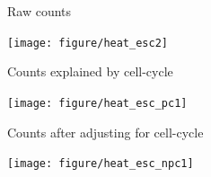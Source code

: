 \documentclass{beamer}\usepackage[]{graphicx}\usepackage[]{color}
\newenvironment{knitrout}{}{} %
\begin{document}
\begin{frame}[fragile]{Raw counts}
\begin{knitrout}\tiny
{}\color{fgcolor}

{\centering \texttt{[image: figure/heat\_esc2]} 

}



\end{knitrout}
\end{frame}

\begin{frame}[fragile]{Counts explained by cell-cycle}
\begin{knitrout}\tiny
{}\color{fgcolor}

{\centering \texttt{[image: figure/heat\_esc\_pc1]} 

}



\end{knitrout}
\end{frame}

\begin{frame}[fragile]{Counts after adjusting for cell-cycle}
\begin{knitrout}\tiny
{}\color{fgcolor}

{\centering \texttt{[image: figure/heat\_esc\_npc1]} 

}



\end{knitrout}
\end{frame}



\end{document}
